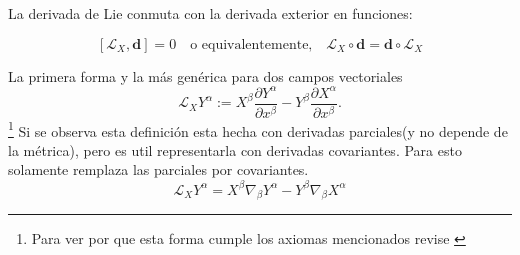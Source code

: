 \begin{axiom}\label{ax:Lie4}
    La derivada de Lie conmuta con la derivada exterior en funciones:


    \begin{equation}
    \left[\mathcal{L}_X, \mathbf{d} \right] = 0 \quad \text{o equivalentemente,} \quad \mathcal{L}_X \circ \mathbf{d} = \mathbf{d} \circ \mathcal{L}_X
    \end{equation}
    
\end{axiom}
\noindent La primera forma y la más genérica para dos campos vectoriales 
\begin{equation}
    \mathscr{L}_X Y^\alpha := X^\beta \frac{\partial Y^\alpha}{\partial x^\beta}-Y^\beta \frac{\partial X^\alpha}{\partial x^\beta}.
\end{equation}
\footnote{Para ver por que esta forma cumple los axiomas mencionados revise \cite{Lie}}
Si se observa esta definición esta hecha con derivadas parciales(y no depende de la métrica), pero es util representarla con derivadas covariantes. Para esto solamente  remplaza las parciales por covariantes.
\begin{equation}
    \mathscr{L}_X Y^\alpha = X^\beta \nabla_\beta Y^\alpha  - Y^\beta \nabla_\beta X^\alpha 
\end{equation}

